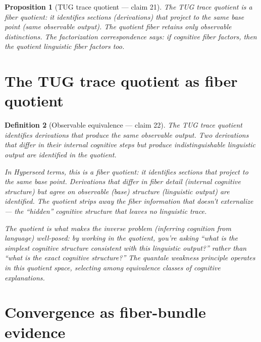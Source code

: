 \documentclass[11pt,a4paper]{article}
\newtheorem{definition}{Definition}[section]
\newtheorem{proposition}[definition]{Proposition}
\begin{document}
\begin{proposition}[TUG trace quotient --- claim 21]
\label{prop:tug}
The TUG trace quotient is a fiber quotient: it identifies sections
(derivations) that project to the same base point (same observable
output). The quotient fiber retains only observable distinctions.
The factorization correspondence says: if cognitive fiber factors,
then the quotient linguistic fiber factors too.
\end{proposition}


\section{The TUG trace quotient as fiber quotient}
\label{sec:tug}

\begin{definition}[Observable equivalence --- claim 22]
\label{def:tug}
The TUG trace quotient identifies derivations that produce the same
observable output. Two derivations that differ in their internal
cognitive steps but produce indistinguishable linguistic output are
identified in the quotient.

In Hyperseed terms, this is a \emph{fiber quotient}: it identifies
sections that project to the same base point. Derivations that
differ in fiber detail (internal cognitive structure) but agree on
observable (base) structure (linguistic output) are identified.
The quotient strips away the fiber information that doesn't
externalize --- the ``hidden'' cognitive structure that leaves no
linguistic trace.

The quotient is what makes the inverse problem (inferring cognition
from language) well-posed: by working in the quotient, you're asking
``what is the simplest cognitive structure consistent with this
linguistic output?'' rather than ``what is the exact cognitive
structure?'' The quantale weakness principle operates in this
quotient space, selecting among equivalence classes of cognitive
explanations.
\end{definition}


\section{Convergence as fiber-bundle evidence}
\label{sec:convergence}
\end{document}

